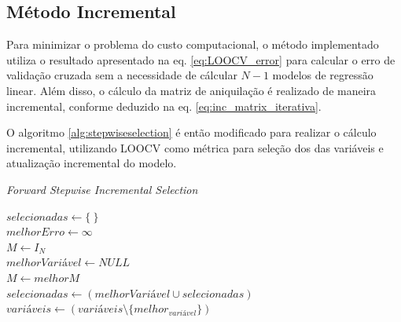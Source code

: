 \subsection{Método Incremental}

Para minimizar o problema do custo computacional, o método implementado utiliza o resultado apresentado na eq. \ref{eq:LOOCV_error} para calcular o erro de validação cruzada sem a necessidade de cálcular $N-1$ modelos de regressão linear. Além disso, o cálculo da matriz de aniquilação é realizado de maneira incremental, conforme deduzido na eq. \ref{eq:inc_matrix_iterativa}.

O algoritmo \ref{alg:stepwiseselection} é então modificado para realizar o cálculo incremental, utilizando LOOCV como métrica para seleção dos das variáveis e atualização incremental do modelo.

\qquad

\begin{algorithm}[H]
    \caption{\textit{Forward Stepwise Incremental Selection}}
    
    $selecionadas \gets \{\ \}$ \\
    $melhorErro \gets \infty$ \\
    $M \gets I_N$ \\

    { 
        $melhorVariável \gets NULL$ \\
        $M \gets melhorM $ \\
        $selecionadas \gets (melhorVariável \cup selecionadas)$ \\
        $variáveis \gets (variáveis \setminus \{melhor_{variável}\})$ \\
    }
    \label{alg:incstepwiseselection}
\end{algorithm}

